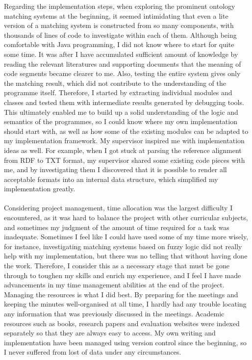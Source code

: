 Regarding the implementation steps, when exploring the prominent ontology matching systems at the beginning, it seemed intimidating that even a lite version of a matching system is constructed from so many components, with thousands of lines of code to investigate within each of them. Although being comfortable with Java programming, I did not know where to start for quite some time. It was after I have accumulated sufficient amount of knowledge by reading the relevant literatures and supporting documents that the meaning of code segments became clearer to me. Also, testing the entire system gives only the matching result, which did not contribute to the understanding of the programme itself. Therefore, I started by extracting individual modules and classes and tested them with intermediate results generated by debugging tools. This ultimately enabled me to build up a solid understanding of the logic and semantics of the programmes, so I could know where my own implementation should start with, as well as how some of the existing modules can be adapted to my implementation framework. My supervisor inspired me with implementation ideas as well. For example, when I got stuck at parsing the reference alignment from RDF to TXT format, my supervisor shared some existing code pieces with me, and by investigating them I discovered that it is possible to render all acceptable formats into an internal data structure, which simplified my implementation greatly.
\\\\
Considering project management, time allocation was the largest difficulty I encountered, as it was hard to balance the project with other curricular subjects, and sometimes my judgment of the amount of time required for a task was inadequate. Sometimes I feel like I could have used some of my time more wisely, for instance, investigating matching systems based on fuzzy logic did not really help with my implementation, but there was no telling that without having done the work. Therefore, I consider this as a necessary stage that must be gone through to toughen my skills and enrich my experience, and I feel I have made advancements in my time management abilities at the end of the project. Managing the resources is what I did best. By preparing for the meetings and keeping the minutes well-organised at all time, I hardly had any trouble locating any information that was previously discussed in the meetings. Academic resources such as books, research papers and evaluation websites were indexed separately so that they are always easy to access. My own writing and implementation have been managed using version control since the beginning, so I never suffered from lost of data under any circumstances.

